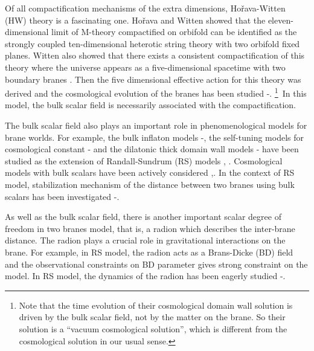 \documentclass[a4paper,11pt]{article}
\begin{document}
Of all compactification mechanisms of the extra dimensions, 
Ho\v{r}ava-Witten (HW) theory is a fascinating one\cite{HW1}\cite{HW2}. 
Ho\v{r}ava and Witten showed that the 
eleven-dimensional limit of M-theory compactified on \coordHE{} 
orbifold can be identified as the strongly coupled ten-dimensional 
\coordHE{} heterotic string theory with two orbifold fixed planes.  
Witten also showed that there exists a consistent compactification of this 
theory where the universe appears as a five-dimensional spacetime 
with two boundary branes \cite{Witten}. Then the five dimensional 
effective action for this theory was derived \cite{Lukas1} and 
the cosmological evolution of the branes has been studied 
\cite{Lukas2}-\cite{Reall}. \footnote{ 
Note that the time evolution of  their cosmological 
domain wall solution is driven by the bulk scalar field, 
not by the matter on the brane. So their solution is a ``vacuum 
cosmological solution'', which is different from the cosmological 
solution in our usual sense. }\ 
In this model, the bulk scalar field is necessarily associated with the 
compactification. 

The bulk scalar field 
also plays an important role in phenomenological models for brane worlds.
For example, the bulk inflaton models 
\cite{KKS}-\cite{SHS}, the self-tuning models for cosmological constant 
\cite{uzawa}-\cite{BCG} and the dilatonic thick domain wall models \cite{KKS2}
-\cite{CEHS} have been studied as the extension of
Randall-Sundrum (RS) models \cite{RS1}, \cite{RS2}. Cosmological models 
with bulk scalars have been actively considered \cite{LM},\cite{MB}. 
In the context of RS model, stabilization mechanism of the 
distance between two branes using bulk scalars has been 
investigated \cite{GW1}-\cite{CF}. 

As well as the bulk scalar field, there is another important 
scalar degree of freedom in two branes model, that is,  a radion 
which describes the inter-brane distance. The radion plays a 
crucial role in gravitational interactions on the brane. 
For example, in RS model, the radion acts as a Brans-Dicke (BD) field
and the observational constraints on BD parameter gives strong constraint
on the model. In RS model, the dynamics of the radion has been eagerly 
studied \cite{CG}-\cite{K}. 
\end{document}
